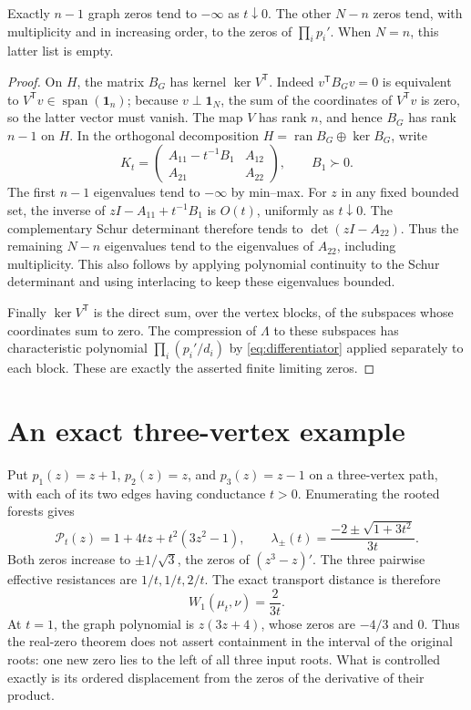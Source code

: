 \begin{corollary}\label{cor:small-coupling}
Exactly $n-1$ graph zeros tend to $-\infty$ as $t\downarrow0$.
The other $N-n$ zeros tend, with multiplicity and in increasing order,
to the zeros of $\prod_i p_i'$.  When $N=n$, this latter list is empty.
\end{corollary}
\begin{proof}
On $H$, the matrix $B_G$ has kernel $\ker V^{\mathsf T}$.
Indeed $v^{\mathsf T}B_Gv=0$ is equivalent to
$V^{\mathsf T}v\in\operatorname{span}(\boldsymbol1_n)$; because
$v\perp\boldsymbol1_N$, the sum of the coordinates of
$V^{\mathsf T}v$ is zero, so the latter vector must vanish.
The map $V$ has rank $n$, and hence $B_G$ has rank $n-1$ on $H$.
In the orthogonal decomposition
$H=\operatorname{ran}B_G\oplus\ker B_G$, write
\[
 K_t=\begin{pmatrix}A_{11}-t^{-1}B_1&A_{12}\\
 A_{21}&A_{22}\end{pmatrix},\qquad B_1\succ0.
\]
The first $n-1$ eigenvalues tend to $-\infty$ by min--max.
For $z$ in any fixed bounded set, the inverse of
$zI-A_{11}+t^{-1}B_1$ is $O(t)$, uniformly as $t\downarrow0$.
The complementary Schur determinant therefore tends to
$\det(zI-A_{22})$.  Thus the remaining $N-n$ eigenvalues tend to
the eigenvalues of $A_{22}$, including multiplicity.  This also follows
by applying polynomial continuity to the Schur determinant and using
interlacing to keep these eigenvalues bounded.

Finally $\ker V^{\mathsf T}$ is the direct sum, over the vertex blocks,
of the subspaces whose coordinates sum to zero.  The compression of
$\Lambda$ to these subspaces has characteristic polynomial
$\prod_i(p_i'/d_i)$ by \eqref{eq:differentiator} applied separately
to each block.  These are exactly the asserted finite limiting zeros.
\end{proof}

\section{An exact three-vertex example}\label{sec:exact-example}

Put $p_1(z)=z+1$, $p_2(z)=z$, and $p_3(z)=z-1$ on a three-vertex
path, with each of its two edges having conductance $t>0$.  Enumerating
the rooted forests gives
\[
 \mathcal P_t(z)=1+4tz+t^2(3z^2-1),\qquad
 \lambda_\pm(t)=\frac{-2\pm\sqrt{1+3t^2}}{3t}.
\]
Both zeros increase to $\pm1/\sqrt3$, the zeros of
$(z^3-z)'$.  The three pairwise effective resistances are
$1/t,1/t,2/t$.  The exact transport distance is therefore
\[
 W_1(\mu_t,\nu)=\frac{2}{3t}.
\]
At $t=1$, the graph polynomial is $z(3z+4)$, whose zeros are
$-4/3$ and $0$.  Thus the real-zero theorem does not assert containment
in the interval of the original roots: one new zero lies to the left
of all three input roots.  What is controlled exactly is its ordered
displacement from the zeros of the derivative of their product.

